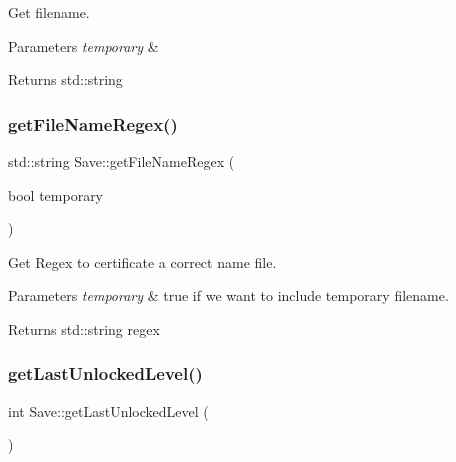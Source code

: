 Get filename. 


\begin{DoxyParams}{Parameters}
{\em temporary} & \\
\hline
\end{DoxyParams}
\begin{DoxyReturn}{Returns}
std\+::string 
\end{DoxyReturn}
\mbox{\label{class_save_a63783fbc06b4c10803b4551aacdde2c8}} 
\subsubsection{\texorpdfstring{get\+File\+Name\+Regex()}{getFileNameRegex()}}
{\footnotesize\ttfamily std\+::string Save\+::get\+File\+Name\+Regex (\begin{DoxyParamCaption}\item[{bool}]{temporary }\end{DoxyParamCaption})\hspace{0.3cm}{\ttfamily [static]}}



Get Regex to certificate a correct name file. 


\begin{DoxyParams}{Parameters}
{\em temporary} & true if we want to include temporary filename. \\
\hline
\end{DoxyParams}
\begin{DoxyReturn}{Returns}
std\+::string regex 
\end{DoxyReturn}
\mbox{\label{class_save_aa772c37949dfc374249fdaf4016be3a6}} 
\subsubsection{\texorpdfstring{get\+Last\+Unlocked\+Level()}{getLastUnlockedLevel()}}
{\footnotesize\ttfamily int Save\+::get\+Last\+Unlocked\+Level (\begin{DoxyParamCaption}{ }\end{DoxyParamCaption})\hspace{0.3cm}{\ttfamily [static]}}



